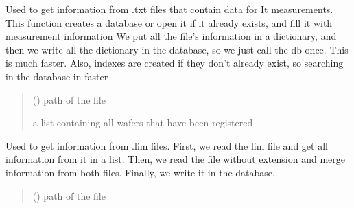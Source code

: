 \documentclass[letterpaper,10pt,english]{sphinxmanual}
\begin{document}

\begin{fulllineitems}
\label{\detokenize{new_manage_DB:new_manage_DB.create_db_it}}
\pysigstartsignatures
{}
\pysigstopsignatures
\sphinxAtStartPar
Used to get information from .txt files that contain data for It measurements.
This function creates a database or open it if it already exists, and fill it with measurement information
We put all the file’s information in a dictionary, and then we write all the dictionary in the database, so we just call the db once.
This is much faster.
Also, indexes are created if they don’t already exist, so searching in the database in faster
\begin{quote}\begin{description}
\sphinxAtStartPar
{} () \textendash{} path of the file

\sphinxAtStartPar
a list containing all wafers that have been registered

\end{description}\end{quote}

\end{fulllineitems}


\begin{fulllineitems}
\label{\detokenize{new_manage_DB:new_manage_DB.create_db_lim}}
\pysigstartsignatures
{}
\pysigstopsignatures
\sphinxAtStartPar
Used to get information from .lim files.
First, we read the lim file and get all information from it in a list.
Then, we read the file without extension and merge information from both files.
Finally, we write it in the database.
\begin{quote}\begin{description}
\sphinxAtStartPar
{} () \textendash{} path of the file

\end{description}\end{quote}

\end{fulllineitems}
\end{document}
